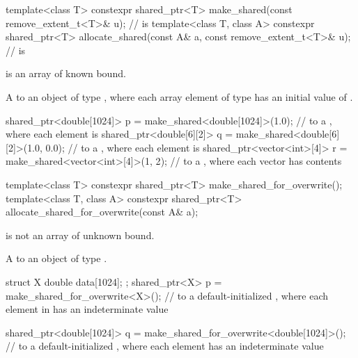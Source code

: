 %
%
\begin{itemdecl}
template<class T>
  constexpr shared_ptr<T> make_shared(const remove_extent_t<T>& u);       //  is 
template<class T, class A>
  constexpr shared_ptr<T> allocate_shared(const A& a,
                                          const remove_extent_t<T>& u);   //  is 
\end{itemdecl}

\begin{itemdescr}
\pnum
\constraints
{} is an array of known bound.

\pnum
\returns
A  to an object of type ,
where each array element of type 
has an initial value of .

\pnum
\begin{example}
\begin{codeblock}
shared_ptr<double[1024]> p = make_shared<double[1024]>(1.0);
  //  to a , where each element is 
shared_ptr<double[6][2]> q = make_shared<double[6][2]>({1.0, 0.0});
  //  to a , where each  element is 
shared_ptr<vector<int>[4]> r = make_shared<vector<int>[4]>({1, 2});
  //  to a , where each vector has contents 
\end{codeblock}
\end{example}
\end{itemdescr}

%
%
\begin{itemdecl}
template<class T>
  constexpr shared_ptr<T> make_shared_for_overwrite();
template<class T, class A>
  constexpr shared_ptr<T> allocate_shared_for_overwrite(const A& a);
\end{itemdecl}

\begin{itemdescr}
\pnum
\constraints
{} is not an array of unknown bound.

\pnum
\returns
A  to an object of type .

\pnum
\begin{example}
\begin{codeblock}
struct X { double data[1024]; };
shared_ptr<X> p = make_shared_for_overwrite<X>();
  //  to a default-initialized , where each element in  has an indeterminate value

shared_ptr<double[1024]> q = make_shared_for_overwrite<double[1024]>();
  //  to a default-initialized , where each element has an indeterminate value
\end{codeblock}
\end{example}
\end{itemdescr}

